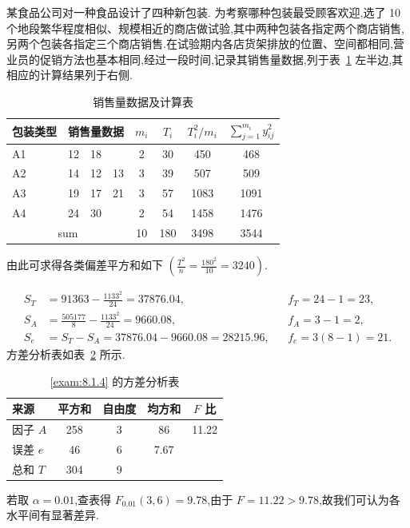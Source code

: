 \begin{example}\label{exam:8.1.4}
某食品公司对一种食品设计了四种新包装. 为考察哪种包装最受顾客欢迎,选了 10 个地段繁华程度相似、规模相近的商店做试验,其中两种包装各指定两个商店销售,另两个包装各指定三个商店销售.在试验期内各店货架排放的位置、空间都相同,营业员的促销方法也基本相同,经过一段时间,记录其销售量数据,列于表~\ref{tab:8.1.6} 左半边,其相应的计算结果列于右侧. 
\begin{table}[htbp]
  \centering
  \caption{销售量数据及计算表}
    \begin{tabular}{cccccccc}
    \toprule
    包装类型 & \multicolumn{3}{c}{销售量数据} & $m_i$ & $T_i$ &$T_i^2/m_i$ & $\sum_{j=1}^{m_i} y_{ij}^2$ \\
    \midrule
    \multicolumn{1}{l}{A1} & \multicolumn{1}{r}{12} & \multicolumn{1}{r}{18} &       & 2     & 30    & 450   & 468 \\
    \multicolumn{1}{l}{A2} & \multicolumn{1}{r}{14} & \multicolumn{1}{r}{12} & \multicolumn{1}{r}{13} & 3     & 39    & 507   & 509 \\
    \multicolumn{1}{l}{A3} & \multicolumn{1}{r}{19} & \multicolumn{1}{r}{17} & \multicolumn{1}{r}{21} & 3     & 57    & 1083  & 1091 \\
    \multicolumn{1}{l}{A4} & \multicolumn{1}{r}{24} & \multicolumn{1}{r}{30} &       & 2     & 54    & 1458  & 1476 \\
    \midrule
    \multicolumn{4}{c}{sum}       & 10    & 180   & 3498  & 3544 \\
    \bottomrule
    \end{tabular}%
  \label{tab:8.1.6}%
\end{table}%

由此可求得各类偏差平方和如下 $\left(\frac{T^{2}}{n}=\frac{180^{2}}{10}=3240\right)$.


\begin{align*}
  S_T & = 91363 - \frac{1133^2}{24} = 37876.04, && f_T = 24-1=23,\\
  S_A &= \frac{505177}{8} - \frac{1133^2}{24} = 9660.08, && f_A = 3 - 1 = 2,\\
  S_e &= S_{T} - S_A = 37876.04 - 9660.08 = 28215.96, && f_{e} = 3(8-1)=21.
\end{align*}
方差分析表如表~\ref{tab:8.1.7} 所示.
  
  \begin{table}[htbp]
    \centering
    \caption{\ref{exam:8.1.4} 的方差分析表}
      \begin{tabular}{lcccc}
      \toprule
      来源    & 平方和   & 自由度   & 均方和   & $F$ 比 \\
      \midrule
      因子 $A$  & 258 & 3    & 86 & 11.22 \\
      误差 $e$  & 46 & 6    & 7.67 &  \\
      总和 $T$  & 304 & 9    &       &  \\
      \bottomrule
      \end{tabular}%
    \label{tab:8.1.7}%
  \end{table}%
  若取 $\alpha=0.01$,查表得 $F_{0.01}(3,6)=9.78$,由于 $F = 11.22 > 9.78$,故我们可认为各水平间有显著差异.
  

\end{example}
